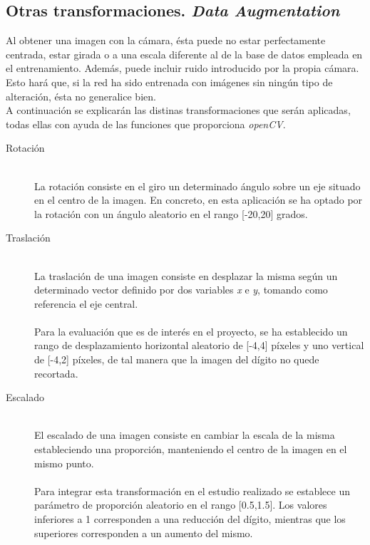 \subsection{Otras transformaciones. \textit{Data Augmentation}}
Al obtener una imagen con la cámara, ésta puede no estar perfectamente centrada, estar girada o a una escala diferente al de la base de datos empleada en el entrenamiento. Además, puede incluir ruido introducido por la propia cámara. Esto hará que, si la red ha sido entrenada con imágenes sin ningún tipo de alteración, ésta no generalice bien.\\

A continuación se explicarán las distinas transformaciones que serán aplicadas, todas ellas con ayuda de las funciones que proporciona \textit{openCV}.
\vspace{10pt}
\begin{description}
	\item[Rotación] \hfill 
	\vspace{5pt}
	\\
	La rotación consiste en el giro un determinado ángulo sobre un eje situado en el centro de la imagen. En concreto, en esta aplicación se ha optado por la rotación con un ángulo aleatorio en el rango [-20,20] grados.
	\vspace{10pt}
	\item[Traslación] \hfill 
	\vspace{5pt}
	\\
	La traslación de una imagen consiste en desplazar la misma según un determinado vector definido por dos variables \textit{x} e \textit{y}, tomando como referencia el eje central.\\
	\vspace{-10pt}
	\\
	Para la evaluación que es de interés en el proyecto, se ha establecido un rango de desplazamiento horizontal aleatorio de [-4,4] píxeles y uno vertical de [-4,2] píxeles, de tal manera que la imagen del dígito no quede recortada.
	\vspace{10pt}
	\item[Escalado] \hfill 
	\vspace{5pt}
	\\
	El escalado de una imagen consiste en cambiar la escala de la misma estableciendo una proporción, manteniendo el centro de la imagen en el mismo punto.\\
	\vspace{-10pt}
	\\
	Para integrar esta transformación en el estudio realizado se establece un parámetro de proporción aleatorio en el rango [0.5,1.5]. Los valores inferiores a 1 corresponden a una reducción del dígito, mientras que los superiores corresponden a un aumento del mismo.\\

\end{description}
